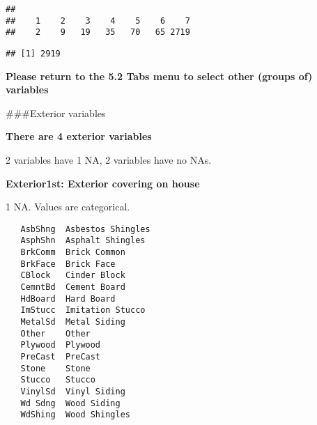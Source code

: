 \documentclass[]{article}
\newenvironment{Shaded}{\begin{snugshade}}{\end{snugshade}}
\newcommand{\CommentTok}[1]{\textcolor[rgb]{0.56,0.35,0.01}{\textit{#1}}}
\newcommand{\DecValTok}[1]{\textcolor[rgb]{0.00,0.00,0.81}{#1}}
\newcommand{\KeywordTok}[1]{\textcolor[rgb]{0.13,0.29,0.53}{\textbf{#1}}}
\newcommand{\NormalTok}[1]{#1}
\newcommand{\OperatorTok}[1]{\textcolor[rgb]{0.81,0.36,0.00}{\textbf{#1}}}
\newcommand{\StringTok}[1]{\textcolor[rgb]{0.31,0.60,0.02}{#1}}
\begin{document}
\begin{verbatim}
## 
##    1    2    3    4    5    6    7 
##    2    9   19   35   70   65 2719
\end{verbatim}

\begin{Shaded}
\end{Shaded}

\begin{verbatim}
## [1] 2919
\end{verbatim}

\textbf{Please return to the 5.2 Tabs menu to select other (groups of)
variables}

\#\#\#Exterior variables

\textbf{There are 4 exterior variables}

2 variables have 1 NA, 2 variables have no NAs.

\textbf{Exterior1st: Exterior covering on house}

1 NA. Values are categorical.

\begin{verbatim}
   AsbShng  Asbestos Shingles
   AsphShn  Asphalt Shingles
   BrkComm  Brick Common
   BrkFace  Brick Face
   CBlock   Cinder Block
   CemntBd  Cement Board
   HdBoard  Hard Board
   ImStucc  Imitation Stucco
   MetalSd  Metal Siding
   Other    Other
   Plywood  Plywood
   PreCast  PreCast 
   Stone    Stone
   Stucco   Stucco
   VinylSd  Vinyl Siding
   Wd Sdng  Wood Siding
   WdShing  Wood Shingles
\end{verbatim}

\begin{Shaded}
\end{Shaded}
\end{document}

